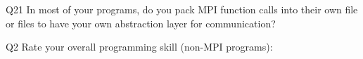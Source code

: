 \begin{description}%
\item{Q21} In most of your programs, do you pack MPI function calls into their own file or files to have your own abstraction layer for communication?%
\item{Q2} Rate your overall programming skill (non-MPI programs):%
\end{description}%
